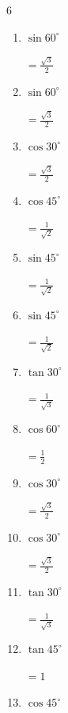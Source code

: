\begin{multicols}{6}
\begin{enumerate}
        $\displaystyle =1$

  \item $\displaystyle \sin{60^\circ}$

        $\displaystyle =\frac{\sqrt{3}}{2}$

  \item $\displaystyle \sin{60^\circ}$

        $\displaystyle =\frac{\sqrt{3}}{2}$

\columnbreak %

  \item $\displaystyle \cos{30^\circ}$

        $\displaystyle =\frac{\sqrt{3}}{2}$

  \item $\displaystyle \cos{45^\circ}$

        $\displaystyle =\frac{1}{\sqrt{2}}$

  \item $\displaystyle \sin{45^\circ}$

        $\displaystyle =\frac{1}{\sqrt{2}}$

  \item $\displaystyle \sin{45^\circ}$

        $\displaystyle =\frac{1}{\sqrt{2}}$

  \item $\displaystyle \tan{30^\circ}$

        $\displaystyle =\frac{1}{\sqrt{3}}$

  \item $\displaystyle \cos{60^\circ}$

        $\displaystyle =\frac{1}{2}$

  \item $\displaystyle \cos{30^\circ}$

        $\displaystyle =\frac{\sqrt{3}}{2}$

  \item $\displaystyle \cos{30^\circ}$

        $\displaystyle =\frac{\sqrt{3}}{2}$

  \item $\displaystyle \tan{30^\circ}$

        $\displaystyle =\frac{1}{\sqrt{3}}$

  \item $\displaystyle \tan{45^\circ}$

        $\displaystyle =1$

  \item $\displaystyle \cos{45^\circ}$


\end{enumerate}
\end{multicols}
